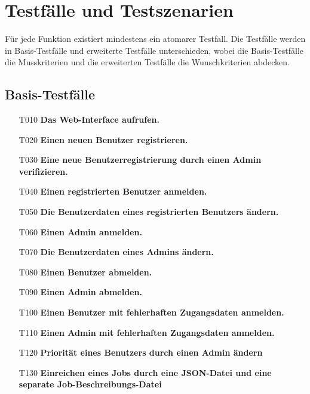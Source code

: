 \section{Testfälle und Testszenarien}
Für jede Funktion existiert mindestens ein atomarer Testfall. Die Testfälle werden in Basis-Testfälle und erweiterte Testfälle unterschieden, wobei die Basis-Testfälle die Musskriterien und die erweiterten Testfälle die Wunschkriterien abdecken.

\subsection{Basis-Testfälle}


\begin{itemize}
    \item[T010] \textbf{Das Web-Interface aufrufen.} 
    
    \item[T020] \textbf{Einen neuen Benutzer registrieren.}
    
    \item[T030] \textbf{Eine neue Benutzerregistrierung durch einen Admin verifizieren.}
    
    \item[T040] \textbf{Einen registrierten Benutzer anmelden.}
    
    \item[T050] \textbf{Die Benutzerdaten eines registrierten Benutzers ändern.}
    
    \item[T060] \textbf{Einen Admin anmelden.}
    
    \item[T070] \textbf{Die Benutzerdaten eines Admins ändern.}
    
    \item[T080] \textbf{Einen Benutzer abmelden.}
    
    \item[T090] \textbf{Einen Admin abmelden.}
    
    \item[T100] \textbf{Einen Benutzer mit fehlerhaften Zugangsdaten anmelden.}
    
    \item[T110] \textbf{Einen Admin mit fehlerhaften Zugangsdaten anmelden.}
    
    \item[T120] \textbf{Priorität eines Benutzers durch einen Admin ändern}
    
    \item[T130] \textbf{Einreichen eines Jobs durch eine JSON-Datei und eine separate Job-Beschreibungs-Datei}
    

\end{itemize}
